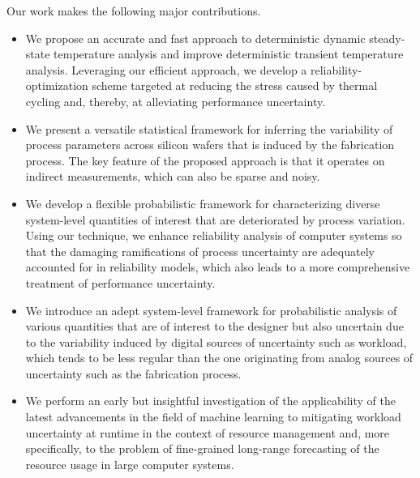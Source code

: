 Our work makes the following major contributions.

\begin{itemize}

\item
We propose an accurate and fast approach to deterministic dynamic steady-state
temperature analysis and improve deterministic transient temperature analysis.
Leveraging our efficient approach, we develop a reliability-optimization scheme
targeted at reducing the stress caused by thermal cycling and, thereby, at
alleviating performance uncertainty.

\item
We present a versatile statistical framework for inferring the variability of
process parameters across silicon wafers that is induced by the fabrication
process. The key feature of the proposed approach is that it operates on
indirect measurements, which can also be sparse and noisy.

\item
We develop a flexible probabilistic framework for characterizing diverse
system-level quantities of interest that are deteriorated by process variation.
Using our technique, we enhance reliability analysis of computer systems so that
the damaging ramifications of process uncertainty are adequately accounted for
in reliability models, which also leads to a more comprehensive treatment of
performance uncertainty.

\item
We introduce an adept system-level framework for probabilistic analysis of
various quantities that are of interest to the designer but also uncertain due
to the variability induced by digital sources of uncertainty such as workload,
which tends to be less regular than the one originating from analog sources of
uncertainty such as the fabrication process.

\item
We perform an early but insightful investigation of the applicability of the
latest advancements in the field of machine learning to mitigating workload
uncertainty at runtime in the context of resource management and, more
specifically, to the problem of fine-grained long-range forecasting of the
resource usage in large computer systems.

\end{itemize}
